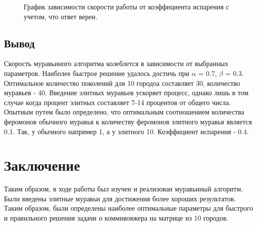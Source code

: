 \documentclass[12pt, a4paper]{report}
\begin{document}
  				\begin{figure}[ht!]
  					\centering
  					\caption{График зависимости скорости работы от коэффициента испарения с учетом, что ответ верен.}
  					\label{grf:eva_time}
  				\end{figure}
    				
    \section{Вывод}
    \hspace{0.5cm}Скорость муравьиного алгоритма колеблется в зависимости от выбранных параметров. Наиболее быстрое решение удалось достичь при $\alpha$ = 0.7, $\beta$ = 0.3. Оптимальное количество поколений для 10 городоа составляет 30, количество муравьев - 40. Введение элитных муравьев ускоряет процесс, однако лишь в том случае когда процент элитных составляет 7-14 процентов от общего числа. Опытным путем было определено, что оптимальным соотношением количества феромонов обычного муравья к количеству феромонов элитного муравья является 0.1. Так, у обычного например 1, а у элитного 10. Коэффициент испарения - 0.4.

    \chapter*{Заключение}
    \hspace{0.5cm}Таким образом, в ходе работы был изучен и реализован муравьиный алгоритм. Были введены элитные муравьи для достижения более хороших результатов. Таким образом, были определены наиболее оптимальные параметры для быстрого и правильного решения задачи о коммивояжера на матрице из 10 городов.
    \newpage
    
\end{document}
